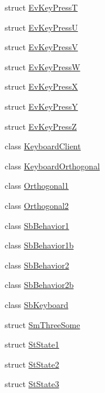 \begin{DoxyCompactItemize}
struct \hyperlink{structsm__three__some_1_1EvKeyPressT}{Ev\+Key\+PressT}
\item 
struct \hyperlink{structsm__three__some_1_1EvKeyPressU}{Ev\+Key\+PressU}
\item 
struct \hyperlink{structsm__three__some_1_1EvKeyPressV}{Ev\+Key\+PressV}
\item 
struct \hyperlink{structsm__three__some_1_1EvKeyPressW}{Ev\+Key\+PressW}
\item 
struct \hyperlink{structsm__three__some_1_1EvKeyPressX}{Ev\+Key\+PressX}
\item 
struct \hyperlink{structsm__three__some_1_1EvKeyPressY}{Ev\+Key\+PressY}
\item 
struct \hyperlink{structsm__three__some_1_1EvKeyPressZ}{Ev\+Key\+PressZ}
\item 
class \hyperlink{classsm__three__some_1_1KeyboardClient}{Keyboard\+Client}
\item 
class \hyperlink{classsm__three__some_1_1KeyboardOrthogonal}{Keyboard\+Orthogonal}
\item 
class \hyperlink{classsm__three__some_1_1Orthogonal1}{Orthogonal1}
\item 
class \hyperlink{classsm__three__some_1_1Orthogonal2}{Orthogonal2}
\item 
class \hyperlink{classsm__three__some_1_1SbBehavior1}{Sb\+Behavior1}
\item 
class \hyperlink{classsm__three__some_1_1SbBehavior1b}{Sb\+Behavior1b}
\item 
class \hyperlink{classsm__three__some_1_1SbBehavior2}{Sb\+Behavior2}
\item 
class \hyperlink{classsm__three__some_1_1SbBehavior2b}{Sb\+Behavior2b}
\item 
class \hyperlink{classsm__three__some_1_1SbKeyboard}{Sb\+Keyboard}
\item 
struct \hyperlink{structsm__three__some_1_1SmThreeSome}{Sm\+Three\+Some}
\item 
struct \hyperlink{structsm__three__some_1_1StState1}{St\+State1}
\item 
struct \hyperlink{structsm__three__some_1_1StState2}{St\+State2}
\item 
struct \hyperlink{structsm__three__some_1_1StState3}{St\+State3}
\end{DoxyCompactItemize}
